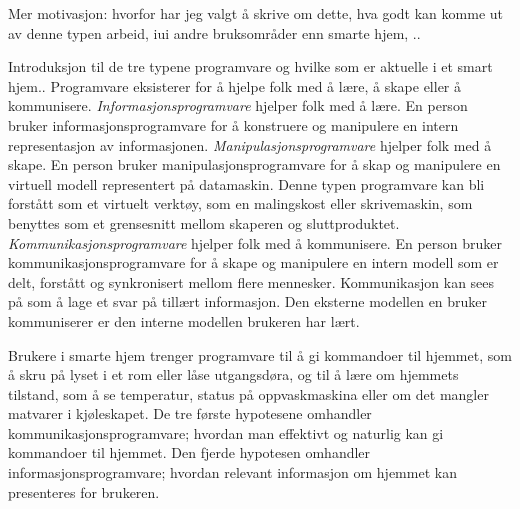 {\color{red}Mer motivasjon: hvorfor har jeg valgt å skrive om dette, hva godt kan komme ut av denne typen arbeid, iui andre bruksområder enn smarte hjem, ..}

{\color{red}Introduksjon til de tre typene programvare og hvilke som er aktuelle i et smart hjem..}
\citet{levold07} 
\citet{victor06}
Programvare eksisterer for å hjelpe folk med å lære, å skape eller å kommunisere. \emph{Informasjonsprogramvare} hjelper folk med å lære. En person bruker informasjonsprogramvare for å konstruere og manipulere en intern representasjon av informasjonen. \emph{Manipulasjonsprogramvare} hjelper folk med å skape. En person bruker manipulasjonsprogramvare for å skap og manipulere en virtuell modell representert på datamaskin. Denne typen programvare kan bli forstått som et virtuelt verktøy, som en malingskost eller skrivemaskin, som benyttes som et grensesnitt mellom skaperen og sluttproduktet. \emph{Kommunikasjonsprogramvare} hjelper folk med å kommunisere. En person bruker kommunikasjonsprogramvare for å skape og manipulere en intern modell som er delt, forstått og synkronisert mellom flere mennesker. Kommunikasjon kan sees på som å lage et svar på tillært informasjon. Den eksterne modellen en bruker kommuniserer er den interne modellen brukeren har lært.

Brukere i smarte hjem trenger programvare til å gi kommandoer til hjemmet, som å skru på lyset i et rom eller låse utgangsdøra, og til å lære om hjemmets tilstand, som å se temperatur, status på oppvaskmaskina eller om det mangler matvarer i kjøleskapet. De tre første hypotesene omhandler kommunikasjonsprogramvare; hvordan man effektivt og naturlig kan gi kommandoer til hjemmet. Den fjerde hypotesen omhandler informasjonsprogramvare; hvordan relevant informasjon om hjemmet kan presenteres for brukeren.


